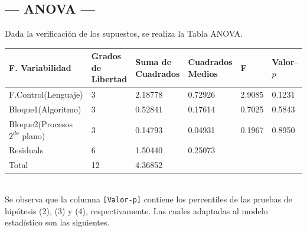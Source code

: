 \documentclass[11pt,a4paper]{article}
\begin{document}
\newpage

\subsection{--- ANOVA ---} %
\label{sub:anova}
Dada la verificación de los supuestos, se realiza la Tabla ANOVA.
\begin{table}[hbt!]
	\footnotesize
	\centering
	\begin{tabular}{|*{6}{l|}}
		\hline
		F. Variabilidad                    & Grados de Libertad & Suma de Cuadrados & Cuadrados Medios & F & Valor--\(p\) \\ \hline
		F.Control(Lenguaje)                & 3 & 2.18778 & 0.72926  & 2.9085 & 0.1231 \\ \hline
		Bloque1(Algoritmo)                 & 3 & 0.52841 & 0.17614  & 0.7025 & 0.5843 \\ \hline
		Bloque2(Procesos \(2^{do}\) plano) & 3 & 0.14793 & 0.04931  & 0.1967 & 0.8950 \\ \hline
		Residuals                          & 6 & 1.50440 & 0.25073  &        &        \\ \hline
		Total                              &12 & 4.36852 &          &        & \\ \hline
	\end{tabular}
	\label{tab:anova}
\end{table}\\
Se observa que la columna \texttt{[Valor-p]} contiene los percentiles de las pruebas de hipótesis (2), (3) y (4), respectivamente. Las cuales adaptadas al modelo estadístico son las siguientes.
\end{document}
